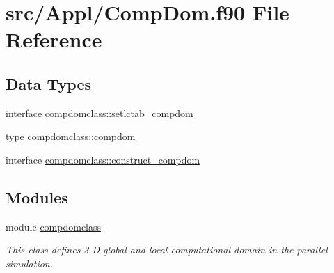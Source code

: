 \hypertarget{_comp_dom_8f90}{}\section{src/\+Appl/\+Comp\+Dom.f90 File Reference}
\label{_comp_dom_8f90}
\subsection*{Data Types}
\begin{DoxyCompactItemize}
\item 
interface \mbox{\hyperlink{interfacecompdomclass_1_1setlctab__compdom}{compdomclass\+::setlctab\+\_\+compdom}}
\item 
type \mbox{\hyperlink{namespacecompdomclass_structcompdomclass_1_1compdom}{compdomclass\+::compdom}}
\item 
interface \mbox{\hyperlink{interfacecompdomclass_1_1construct__compdom}{compdomclass\+::construct\+\_\+compdom}}
\end{DoxyCompactItemize}
\subsection*{Modules}
\begin{DoxyCompactItemize}
\item 
module \mbox{\hyperlink{namespacecompdomclass}{compdomclass}}
\begin{DoxyCompactList}\small\item\em This class defines 3-\/D global and local computational domain in the parallel simulation. \end{DoxyCompactList}\end{DoxyCompactItemize}
